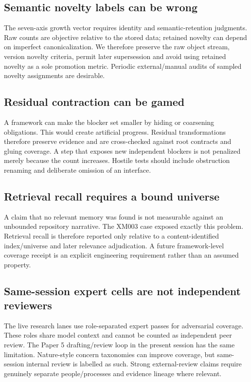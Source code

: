 \subsection{Semantic novelty labels can be wrong}

The seven-axis growth vector requires identity and semantic-retention judgments. Raw counts are objective relative to the stored data; retained novelty can depend on imperfect canonicalization. We therefore preserve the raw object stream, version novelty criteria, permit later supersession and avoid using retained novelty as a sole promotion metric. Periodic external/manual audits of sampled novelty assignments are desirable.

\subsection{Residual contraction can be gamed}

A framework can make the blocker set smaller by hiding or coarsening obligations. This would create artificial progress. Residual transformations therefore preserve evidence and are cross-checked against root contracts and gluing coverage. A step that exposes new independent blockers is not penalized merely because the count increases. Hostile tests should include obstruction renaming and deliberate omission of an interface.

\subsection{Retrieval recall requires a bound universe}

A claim that no relevant memory was found is not measurable against an unbounded repository narrative. The XM003 case exposed exactly this problem. Retrieval recall is therefore reported only relative to a content-identified index/universe and later relevance adjudication. A future framework-level coverage receipt is an explicit engineering requirement rather than an assumed property.

\subsection{Same-session expert cells are not independent reviewers}

The live research lanes use role-separated expert passes for adversarial coverage. These roles share model context and cannot be counted as independent peer review. The Paper 5 drafting/review loop in the present session has the same limitation. Nature-style concern taxonomies can improve coverage, but same-session internal review is labelled as such. Strong external-review claims require genuinely separate people/processes and evidence lineage where relevant.

